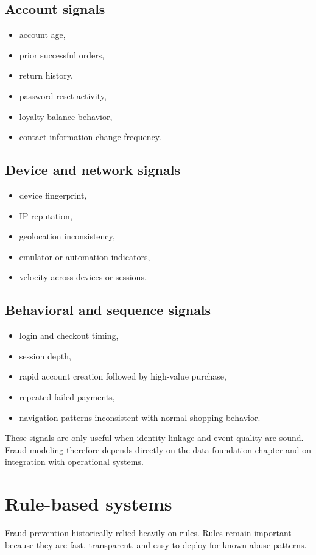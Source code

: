 \subsection{Account signals}
\begin{itemize}
  \item account age,
  \item prior successful orders,
  \item return history,
  \item password reset activity,
  \item loyalty balance behavior,
  \item contact-information change frequency.
\end{itemize}

\subsection{Device and network signals}
\begin{itemize}
  \item device fingerprint,
  \item IP reputation,
  \item geolocation inconsistency,
  \item emulator or automation indicators,
  \item velocity across devices or sessions.
\end{itemize}

\subsection{Behavioral and sequence signals}
\begin{itemize}
  \item login and checkout timing,
  \item session depth,
  \item rapid account creation followed by high-value purchase,
  \item repeated failed payments,
  \item navigation patterns inconsistent with normal shopping behavior.
\end{itemize}

These signals are only useful when identity linkage and event quality are sound.
Fraud modeling therefore depends directly on the data-foundation chapter and on integration with operational systems.

\section{Rule-based systems}
Fraud prevention historically relied heavily on rules.
Rules remain important because they are fast, transparent, and easy to deploy for known abuse patterns.

